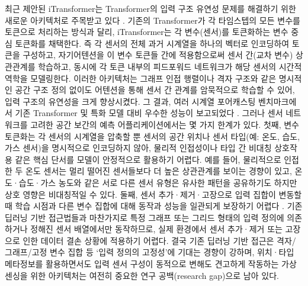 \documentclass[final,5p,times,twocolumn,authoryear]{elsarticle}
\begin{document}



최근 제안된 iTransformer는 Transformer의 입력 구조 유연성 문제를 해결하기 위한 새로운 아키텍처로 주목받고 있다 \cite{liu2023itransformer}. 기존의 Transformer가 각 타임스텝의 모든 변수를 토큰으로 처리하는 방식과 달리, iTransformer는 각 변수(센서)를 토큰화하는 변수 중심 토큰화를 채택한다. 즉 각 센서의 전체 과거 시계열을 하나의 벡터로 인코딩하여 토큰을 구성하고, 자기어텐션을 이 변수 토큰들 간에 적용함으로써 센서 간(교차 변수) 상관관계를 학습하고, 동시에 각 토큰 내부의 피드포워드 네트워크가 해당 센서의 시간적 역학을 모델링한다. 이러한 아키텍처는 그래프 인접 행렬이나 격자 구조와 같은 명시적인 공간 구조 정의 없이도 어텐션을 통해 센서 간 관계를 암묵적으로 학습할 수 있어, 입력 구조의 유연성을 크게 향상시켰다. 그 결과, 여러 시계열 포어캐스팅 벤치마크에서 기존 Transformer 및 특화 모델 대비 우수한 성능이 보고되었다 \cite{liu2023itransformer}. 그러나 센서 네트워크를 고려한 공간 보간의 예측 어플리케이션에서는 몇 가지 한계가 있다. 첫째, 변수 토큰화는 각 센서의 시계열을 압축할 뿐 센서의 공간 위치나 센서 타입(예: 온도, 습도, 가스 센서)을 명시적으로 인코딩하지 않아, 물리적 인접성이나 타입 간 비대칭 상호작용 같은 핵심 단서를 모델이 안정적으로 활용하기 어렵다. 예를 들어, 물리적으로 인접한 두 온도 센서는 멀리 떨어진 센서들보다 더 높은 상관관계를 보이는 경향이 있고, 온도·습도·가스 농도와 같은 서로 다른 센서 유형은 유사한 패턴을 공유하기도 하지만 상호 영향은 비대칭적일 수 있다. 둘째, 센서 추가·제거·고장으로 입력 집합이 변동할 때 학습 시점과 다른 변수 집합에 대해 동작과 성능을 일관되게 보장하기 어렵다 \cite{liu2024iclr_itransformer}. 기존 딥러닝 기반 접근법들과 마찬가지로 특정 그래프 또는 그리드 형태의 입력 정의에 의존하거나 정해진 센서 배열에서만 동작하므로, 실제 환경에서 센서 추가·제거 또는 고장으로 인한 데이터 결손 상황에 적용하기 어렵다. 결국 기존 딥러닝 기반 접근은 격자/그래프/고정 변수 집합 등 ‘입력 정의의 고정성’에 기대는 경향이 강하며, 위치·타입 메타정보를 활용하면서도 입력 센서 구성이 동적으로 변해도 견고하게 작동하는 가상 센싱을 위한 아키텍처는 여전히 중요한 연구 공백(research gap)으로 남아 있다.
\end{document}

